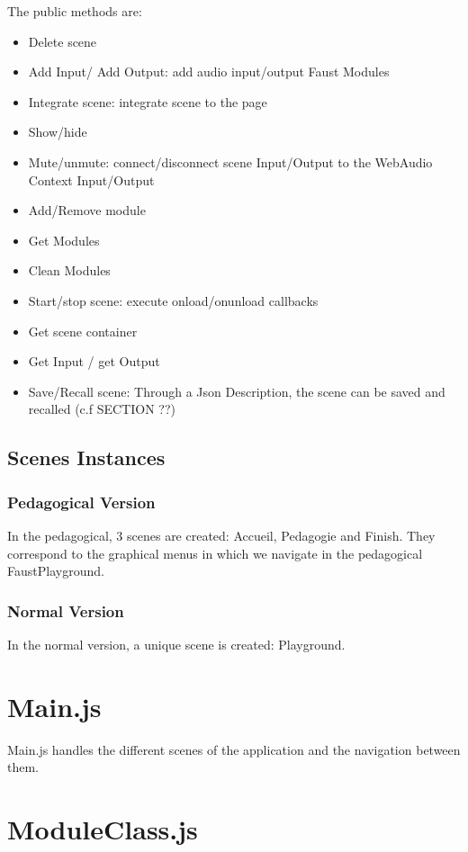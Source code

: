 \documentclass[a4paper]{article}
\begin{document}
The public methods are:
\begin{itemize}
\item Delete scene
\item Add Input/ Add Output: add audio input/output Faust Modules
\item Integrate scene: integrate scene to the page
\item Show/hide
\item Mute/unmute: connect/disconnect scene Input/Output to the WebAudio Context Input/Output
\item Add/Remove module
\item Get Modules
\item Clean Modules
\item Start/stop scene: execute onload/onunload callbacks
\item Get scene container
\item Get Input / get Output
\item Save/Recall scene: Through a Json Description, the scene can be saved and recalled (c.f SECTION ??)
\end{itemize}

\subsection{Scenes Instances}
\subsubsection{Pedagogical Version}
In the pedagogical, 3 scenes are created: Accueil, Pedagogie and Finish.
They correspond to the graphical menus in which we navigate in the pedagogical FaustPlayground.

\subsubsection{Normal Version}
In the normal version, a unique scene is created: Playground.

\section{Main.js}

 Main.js handles the different scenes of the application and the navigation between them.

\section{ModuleClass.js}
\end{document}
